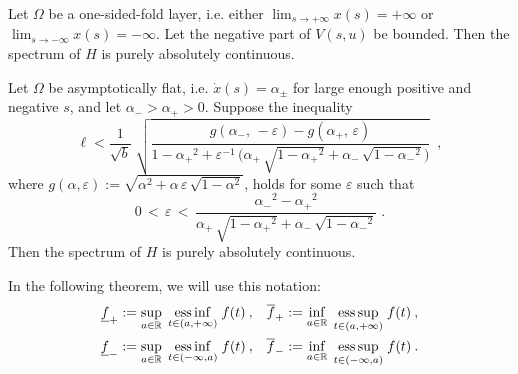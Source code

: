 \begin{thm}
    Let $\Omega$ be a one-sided-fold layer, i.e. either $\lim_{s \to {+\infty}} x(s) = +\infty$ or $\lim_{s \to {-\infty}} x(s) = -\infty$. Let the negative part of $V(s,u)$ be bounded. Then the spectrum of $H$ is purely absolutely continuous.
\end{thm}

\begin{thm}
    Let $\Omega$ be asymptotically flat, i.e. $\dot x(s) = \alpha_\pm$ for large enough positive and negative $s$, and let $\alpha_- > \alpha_+ > 0$. Suppose the inequality
    \begin{equation*}
        \ell < \frac{1}{\sqrt{b}} \;
        \sqrt{
            \frac{
                g(\alpha_-, \, -\varepsilon) -
                g(\alpha_+, \, \varepsilon)
            }{
                1 - {\alpha_+}^2 +
                \varepsilon^{-1} \, \big(
                    \alpha_+ \, \sqrt{1-{\alpha_+}^2} +
                    \alpha_- \, \sqrt{1-{\alpha_-}^2}
                \big)
            }
        }
        \;\: ,
    \end{equation*}
    where $g(\alpha, \varepsilon) := \sqrt{\alpha^2 + \alpha \, \varepsilon \, \sqrt{1-\alpha^2}}$, holds for some $\varepsilon$ such that
    \begin{equation*}
        0
        \,<\,
        \varepsilon
        \,<\,
        \frac{ {\alpha_-}^2 - {\alpha_+}^2 }{
            \alpha_+ \, \sqrt{1-{\alpha_+}^2} +
            \alpha_- \, \sqrt{1-{\alpha_-}^2}
        }
        \; .
    \end{equation*}
    Then the spectrum of $H$ is purely absolutely continuous.
\end{thm}

In the following theorem, we will use this notation:
\begin{align*}
    \underline{f}_+ &:= \sup_{a \in \mathbb{R}} \; \underset{t\in(a, +\infty)}{\operatorname{ess \, inf}} \; f(t) \: ,&
    \overline{f}_+ &:= \inf_{a \in \mathbb{R}} \; \underset{t\in(a, +\infty)}{\operatorname{ess \, sup}} \; f(t) \: ,\\
    \underline{f}_- &:= \sup_{a \in \mathbb{R}} \; \underset{t\in(-\infty, a)}{\operatorname{ess \, inf}} \; f(t) \: , &
    \overline{f}_- &:= \inf_{a \in \mathbb{R}} \; \underset{t\in(-\infty, a)}{\operatorname{ess \, sup}} \; f(t) \: .
\end{align*}

